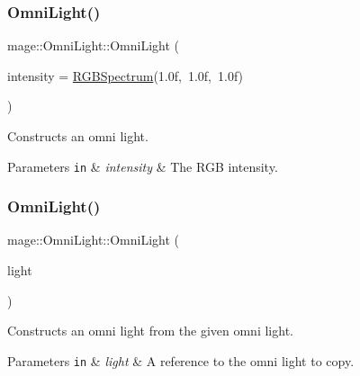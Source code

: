 \subsubsection{\texorpdfstring{Omni\+Light()}{OmniLight()}\hspace{0.1cm}{\footnotesize\ttfamily [1/3]}}
{\footnotesize\ttfamily mage\+::\+Omni\+Light\+::\+Omni\+Light (\begin{DoxyParamCaption}\item[{const \hyperlink{structmage_1_1_r_g_b_spectrum}{R\+G\+B\+Spectrum} \&}]{intensity = {\ttfamily \hyperlink{structmage_1_1_r_g_b_spectrum}{R\+G\+B\+Spectrum}(1.0f,~1.0f,~1.0f)} }\end{DoxyParamCaption})\hspace{0.3cm}{\ttfamily [explicit]}}

Constructs an omni light.


\begin{DoxyParams}[1]{Parameters}
\mbox{\tt in}  & {\em intensity} & The R\+GB intensity. \\
\hline
\end{DoxyParams}
\hypertarget{classmage_1_1_omni_light_accf10bcdf8ed523cfb04129f5345ef92}{}\label{classmage_1_1_omni_light_accf10bcdf8ed523cfb04129f5345ef92} 
\subsubsection{\texorpdfstring{Omni\+Light()}{OmniLight()}\hspace{0.1cm}{\footnotesize\ttfamily [2/3]}}
{\footnotesize\ttfamily mage\+::\+Omni\+Light\+::\+Omni\+Light (\begin{DoxyParamCaption}\item[{const \hyperlink{classmage_1_1_omni_light}{Omni\+Light} \&}]{light }\end{DoxyParamCaption})\hspace{0.3cm}{\ttfamily [default]}}

Constructs an omni light from the given omni light.


\begin{DoxyParams}[1]{Parameters}
\mbox{\tt in}  & {\em light} & A reference to the omni light to copy. \\
\hline
\end{DoxyParams}
\hypertarget{classmage_1_1_omni_light_ae0353cedc67d88be2f4b88374482933d}{}\label{classmage_1_1_omni_light_ae0353cedc67d88be2f4b88374482933d} 
